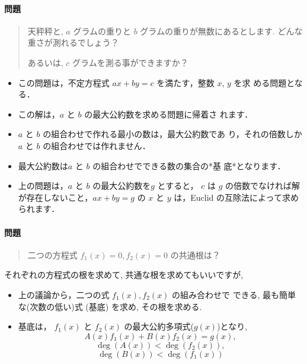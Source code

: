 \documentclass[a4j]{jarticle}
\begin{document}
\paragraph{問題}
\label{sec:org17aa987}

\begin{quote}
天秤秤と, \(a\) グラムの重りと \(b\) グラムの重りが無数にあるとします.
どんな重さが測れるでしょう？

あるいは, \(c\) グラムを測る事ができますか？
\end{quote}

\begin{itemize}
\item この問題は，不定方程式 \(ax+by=c\) を満たす，整数 \(x\), \(y\) を求
める問題となる．

\item この解は，\(a\) と \(b\) の最大公約数を求める問題に帰着さ れます．

\item \(a\) と \(b\) の組合わせで作れる最小の数は，最大公約数であ
り，それの倍数しか\(a\) と \(b\) の組合わせでは作れません．

\item 最大公約数は\(a\) と \(b\) の組合わせでできる数の集合の*基
底*となります．

\item 上の問題は，\(a\) と \(b\) の最大公約数を\(g\) とすると，
\(c\) は \(g\) の倍数でなければ解が存在しないこと，\(a x + b y = g\)
の \(x\) と \(y\) は，Euclid の互除法によって求められます．
\end{itemize}

\paragraph{問題}
\label{sec:org41bf7c3}

\begin{quote}
二つの方程式 \(f_1(x)=0, f_2(x)=0\) の共通根は？
\end{quote}

それぞれの方程式の根を求めて, 共通な根を求めてもいいですが,

\begin{itemize}
\item 上の議論から，二つの式 \(f_1(x), f_2(x)\) の組み合わせで できる,
最も簡単な(次数の低い)式 (基底) を求め, その根を求める.

\item 基底は， \(f_1(x)\) と \(f_2(x)\) の最大公約多項式(\(g(x)\))となり,
$$A(x) f_1(x) + B(x) f_2(x) = g(x),$$ $$\deg(A(x)) < \deg(f_2(x)),$$
$$\deg(B(x)) < \deg(f_1(x))$$
\end{itemize}
\end{document}
